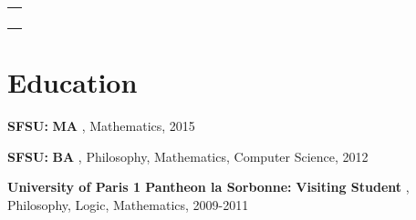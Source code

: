 \documentclass[margin,line,pifont,palatino,courier]{res}
\newenvironment{list1}{
  \begin{list}{\label{ } }{
      \setlength{\itemsep}{0in}
      \setlength{\parsep}{0in} \setlength{\parskip}{0in}
      \setlength{\topsep}{0in} \setlength{\partopsep}{0in}
      \setlength{\leftmargin}{0.0in} } }{\end{list} }
\begin{document}
\begin{resume}
\begin{tabular}{@{}p{5in}}
\begin{list1}
      \vspace{.2em}
      
    \end{list1}
  \end{tabular}


\section{\sc Education} 
  \begin{list1}
    
    
        \item  {\bf SFSU:}\textbf{ MA }, Mathematics, 2015

          
    
        \item  {\bf SFSU:}\textbf{ BA }, Philosophy, Mathematics, Computer Science, 2012

          
    
        \item  {\bf University of Paris 1 Pantheon la Sorbonne:}\textbf{ Visiting Student }, Philosophy, Logic, Mathematics, 2009-2011

          
    

  \end{list1}



\end{resume}
\end{document}

